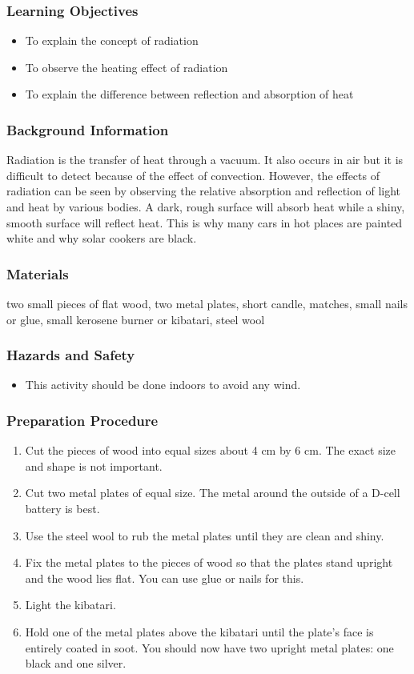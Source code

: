 \subsubsection*{Learning Objectives}
\begin{itemize}
\item{To explain the concept of radiation}
\item{To observe the heating effect of radiation}
\item{To explain the difference between reflection and absorption of heat}
\end{itemize}

\subsubsection*{Background Information}
Radiation is the transfer of heat through a vacuum.  It also occurs in air but it is difficult to detect because of the effect of convection.
However, the effects of radiation can be seen by observing the relative absorption and reflection of light and heat by various bodies.  A dark, rough surface will absorb heat while a shiny, smooth surface will reflect heat.  This is why many cars in hot places are painted white and why solar cookers are black.

\subsubsection*{Materials}
two small pieces of flat wood, two metal plates, short candle, matches, small nails or glue, small kerosene burner or kibatari, steel wool

\subsubsection*{Hazards and Safety}
\begin{itemize}
\item{This activity should be done indoors to avoid any wind.}
\end{itemize}

\subsubsection*{Preparation Procedure}
\begin{enumerate}
\item{Cut the pieces of wood into equal sizes about 4 cm by 6 cm.  The exact size and shape is not important.}
\item{Cut two metal plates of equal size.  The metal around the outside of a D-cell battery is best.}
\item{Use the steel wool to rub the metal plates until they are clean and shiny.}
\item{Fix the metal plates to the pieces of wood so that the plates stand upright and the wood lies flat.  You can use glue or nails for this.}
\item{Light the kibatari.}
\item{Hold one of the metal plates above the kibatari until the plate's face is entirely coated in soot.  You should now have two upright metal plates: one black and one silver.}
\end{enumerate}

